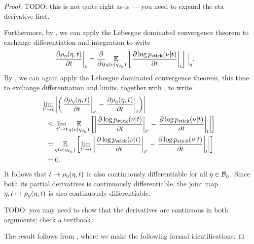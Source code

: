 \begin{thm}
\begin{proof}
TODO: this is not quite right as-is --- you need to expand the eta derivative
first.

Furthermore, by , we can apply
the Lebesgue dominated convergence theorem to exchange differentiation and
integration to write
%
\begin{align*}
%
\fracat{\partial \rho_\eta(\eta, \t)}{\partial\t}{\t} ={}&
    \frac{\partial}{\partial \eta}
    \expect{\q(\nu \vert \etanuk)}{
        \fracat{\partial \log \pstick(\nu \vert \t)}{\partial \t}{\t}
    } \Big\vert_\eta.
%
\end{align*}
%
By , we can again apply the
Lebesgue dominated convergence theorem, this time to exchange differentiation
and limits, together with , to
write
%
\begin{align*}
%
\MoveEqLeft
\lim_{\t' \rightarrow \t} \abs{\left(
    \fracat{\partial \rho_\eta(\eta, \t)}{\partial\t}{\t'} -
    \fracat{\partial \rho_\eta(\eta, \t)}{\partial\t}{\t} \right)}
\\\le{}&
\lim_{\t' \rightarrow \t}
\expect{\q(\nu \vert \etanuk)}{\abs{
    \fracat{\partial \log \pstick(\nu \vert \t)}{\partial \t}{\t'} -
    \fracat{\partial \log \pstick(\nu \vert \t)}{\partial \t}{\t}
}}
\\={}&
\expect{\q(\nu \vert \etanuk)}{\lim_{\t' \rightarrow \t} \abs{
    \fracat{\partial \log \pstick(\nu \vert \t)}{\partial \t}{\t'} -
    \fracat{\partial \log \pstick(\nu \vert \t)}{\partial \t}{\t}
}}
\\={}& 0.
%
\end{align*}
%
It follows that $t \mapsto \rho_\eta(\eta, t)$ is also continuously
differentiable for all $\eta \in \mathcal{B}_\eta$.  Since both its partial
derivatives is continuously differentiable, the joint map $\eta, t \mapsto
\rho_\eta(\eta, t)$ is also continuously differentiable.

TODO: you may need to show that the derivatives are continuous in both
arguments; check a textbook.


The result follows from \citet[Theorem 3.3.1]{krantz:2012:implicit}, where
we make the following formal identifications:


\end{proof}
\end{thm}
